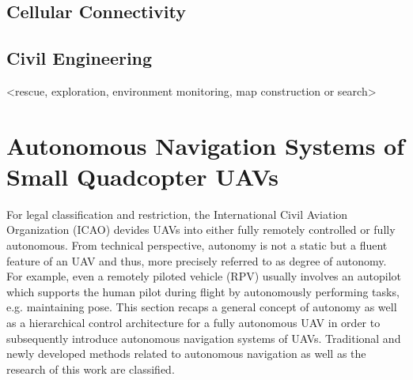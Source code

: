 

\subsection{Cellular Connectivity}



\subsection{Civil Engineering}



<rescue,   exploration,  environment  monitoring,  map  construction  or  search>




\section{Autonomous Navigation Systems of Small Quadcopter UAVs}

For legal classification and restriction,
the International Civil Aviation Organization (ICAO)
devides UAVs into either fully remotely controlled 
or fully autonomous.
From technical perspective,
autonomy is not a static
but a fluent feature of an UAV
and thus, more precisely referred to as
degree of autonomy. For example,
even a remotely piloted vehicle (RPV)
usually involves an autopilot
which supports the human pilot
during flight by autonomously
performing tasks, e.g. maintaining pose.
This section recaps a general
concept of autonomy as well as
a hierarchical control architecture for a
fully autonomous UAV in order to
subsequently introduce
autonomous navigation systems of UAVs.
Traditional and newly developed methods
related to autonomous navigation
as well as 
the research of this work are classified.



